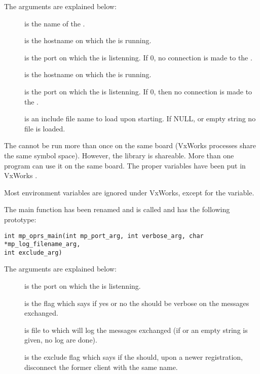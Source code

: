 The arguments are explained below:

\begin{description}

\item[] is the name of the \CPK{}.

\item[] is the hostname on which the \OPRSS{} is running.

\item[] is the port on which the \OPRSS{} is listenning.
If 0, no connection is made to the \OPRSS{}.

\item[] is the hostname on which the \MPA{} is running.

\item[] is the port on which the \MPA{} is listenning. If 0,
then no connection is made to the \MPA{}.

\item[] is an include file name to load upon
starting. If NULL, or empty string no file is loaded.

\end{description}

The \CPK{} cannot be run more than once on the same board (VxWorks processes
share the same symbol space). However, the  library is
shareable. More than one program can use it on the same board. The proper
variables have been put in VxWorks .

Most environment variables are ignored under VxWorks, except for the
 variable.

The \MPA{} main function has been renamed and is called  and
has the following prototype:

\begin{verbatim}
int mp_oprs_main(int mp_port_arg, int verbose_arg, char *mp_log_filename_arg,
int exclude_arg)
\end{verbatim}

The arguments are explained below:

\begin{description}

\item[] is the port on which the \MPA{} is listenning. 

\item[] is the flag which says if yes or no the \MPA{} should
be verbose on the messages exchanged.

\item[] is file to which \MPA{} will log the messages
exchanged (if  or an empty string is given, no log are done).

\item[] is the exclude flag which says if the \MPA{}
should, upon a newer registration, disconnect the former client with the same
name.

\end{description}

